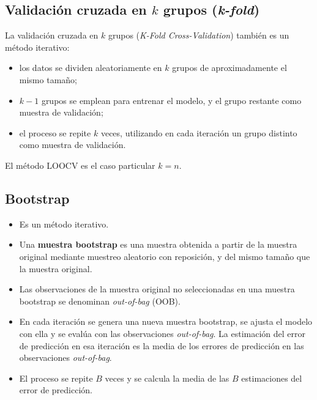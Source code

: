\subsection{Validación cruzada en \texorpdfstring{$k$}{k} grupos (\emph{k-fold})}

La validación cruzada en $k$ grupos (\emph{K-Fold Cross-Validation}) también es un método
iterativo:
\begin{itemize}
  \item los datos se dividen aleatoriamente en $k$ grupos de aproximadamente el mismo tamaño;
  \item $k-1$ grupos se emplean para entrenar el modelo, y el grupo restante como muestra de
    validación;
  \item el proceso se repite $k$ veces, utilizando en cada iteración un grupo distinto como
    muestra de validación.
\end{itemize}
El método LOOCV es el caso particular $k=n$.

\subsection{Bootstrap}

\begin{itemize}
  \item Es un método iterativo.
  \item Una \textbf{muestra bootstrap} es una muestra obtenida a partir de la muestra original
    mediante muestreo aleatorio con reposición, y del mismo tamaño que la muestra original.
  \item Las observaciones de la muestra original no seleccionadas en una muestra bootstrap se
    denominan \emph{out-of-bag} (OOB).
  \item En cada iteración se genera una nueva muestra bootstrap, se ajusta el modelo con ella y se
    evalúa con las observaciones \emph{out-of-bag}. La estimación del error de predicción en esa
    iteración es la media de los errores de predicción en las observaciones \emph{out-of-bag}.
  \item El proceso se repite $B$ veces y se calcula la media de las $B$ estimaciones del error de
    predicción.
\end{itemize}

